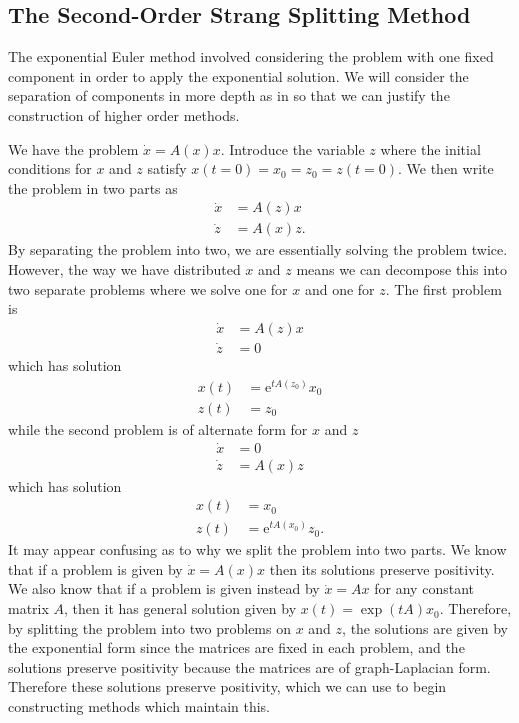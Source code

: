 \subsection{The Second-Order Strang Splitting Method}

The exponential Euler method involved considering the problem with one fixed component in order to apply the exponential solution.
We will consider the separation of components in more depth as in \cite{blanes_pos_2022} so that we can justify the construction of higher order methods.

We have the problem $\dot{x} = A(x)x$. Introduce the variable $z$ where the initial conditions for $x$ and $z$ satisfy $x(t=0) = x_0 = z_0 = z(t=0)$.
We then write the problem in two parts as
\begin{align*}
    \dot{x} &= A(z)x \\
    \dot{z} &= A(x)z.
\end{align*}
By separating the problem into two, we are essentially solving the problem twice.
However, the way we have distributed $x$ and $z$ means we can decompose this into two separate problems where we solve one for $x$ and one for $z$.
The first problem is
\begin{equation}
    \label{eqn:split1}
    \begin{aligned}
        \dot{x} &= A(z)x \\
        \dot{z} &= 0
    \end{aligned}
\end{equation}
which has solution
\begin{align*}
    x(t) &= \mathrm{e}^{tA(z_0)}x_0 \\
    z(t) &= z_0
\end{align*}
while the second problem is of alternate form for $x$ and $z$
\begin{equation}
    \label{eqn:split2}
    \begin{aligned}
        \dot{x} &= 0 \\
        \dot{z} &= A(x)z
    \end{aligned}
\end{equation}
which has solution
\begin{align*}
    x(t) &= x_0 \\
    z(t) &= \mathrm{e}^{tA(x_0)}z_0.
\end{align*}
It may appear confusing as to why we split the problem into two parts.
We know that if a problem is given by $\dot{x} = A(x)x$ then its solutions preserve positivity.
We also know that if a problem is given instead by $\dot{x} = Ax$ for any constant matrix $A$, then it has general solution given by $x(t) = \exp(tA)x_0$.
Therefore, by splitting the problem into two problems on $x$ and $z$,
the solutions are given by the exponential form since the matrices are fixed in each problem,
and the solutions preserve positivity because the matrices are of graph-Laplacian form.
Therefore these solutions preserve positivity, which we can use to begin constructing methods which maintain this.

